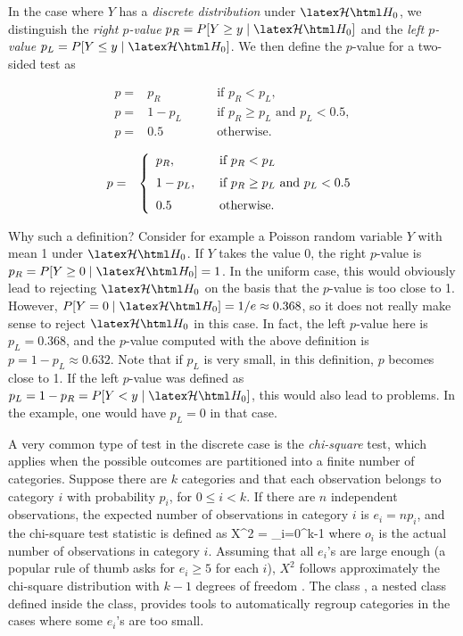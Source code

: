 In the case where $Y$ has a {\em discrete distribution\/}
under $\cH_0$, we distinguish the {\em right $p$-value\/}
$p_R =  P[Y \ge y \mid \cH_0]$ and the {\em left $p$-value\/}
$p_L =  P[Y \le y \mid \cH_0]$.
We then define the $p$-value for a two-sided test as
\begin{htmlonly}
\[\begin{array}{rll}
  p=&p_R&\qquad\mbox{if } p_R < p_L,\\
  p=&1 - p_L&\qquad\mbox{if } p_R \ge p_L\mbox{ and }p_L < 0.5,\\
  p=&0.5 &\qquad\mbox{otherwise.}
\end{array}\]
\end{htmlonly}
\begin{latexonly}
\begin{eqnarray}
   p & = & \left\{
 \begin{array}{l@{\qquad}l}
      p_R, & \mbox{if } p_R <  p_L \\[6pt]
  1 - p_L, & \mbox{if } p_R \ge p_L \mbox{ and } p_L < 0.5 \\[6pt]
      0.5  &         \mbox{otherwise.}
 \end{array}\right.                               \label{eq:pdisc}
\end{eqnarray}
\end{latexonly}
Why such a definition?
Consider for example a Poisson random variable $Y$ with mean 1
under $\cH_0$.
If $Y$ takes the value 0, the right $p$-value is
$p_R =  P[Y \ge 0 \mid \cH_0] = 1$.  In the uniform case, this would
obviously lead to rejecting $\cH_0$
on the basis that the $p$-value is too close to 1.
However, $P[Y = 0 \mid \cH_0] = 1/e
\approx 0.368$, so it does not
really make sense to reject $\cH_0$ in this case.
In fact, the left $p$-value here is $p_L = 0.368$, and the $p$-value
computed with the above definition is $p = 1 - p_L \approx 0.632$.
Note that if $p_L$ is very small, in this definition, $p$ becomes
close to 1.   If the left $p$-value was defined as
$p_L = 1 - p_R = P[Y < y \mid \cH_0]$, this would also lead to problems.
In the example, one would have $p_L = 0$ in that case.

A very common type of test in the discrete case is the
{\em chi-square\/} test, which applies when the possible outcomes are
partitioned into a finite number of categories.
Suppose there are $k$ categories and that each observation belongs
to category $i$ with probability $p_i$, for $0\le i < k$.
If there are $n$ independent observations, the expected number of
observations in category $i$ is $e_i = n p_i$, and the chi-square
test statistic is defined as
\eq
 X^2 = \sum_{i=0}^{k-1} 
\endeq
where $o_i$ is the actual number of observations in category $i$.
Assuming that all $e_i$'s are large enough (a popular rule of thumb
asks for $e_i \ge 5$ for each $i$), $X^2$ follows approximately the
chi-square distribution with $k-1$ degrees of freedom \cite{tREA88a}.
The class
,
a nested class defined inside the
  class, provides tools to automatically
regroup categories in the cases where some $e_i$'s are too small.

